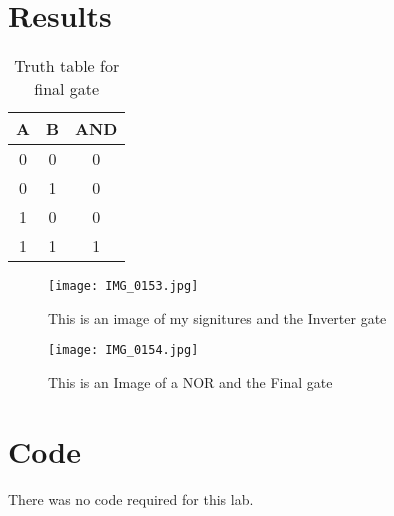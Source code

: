 \documentclass[11pt]{article}
\begin{document}
\section*{Results}

\begin{table}[ht]\centering
	\caption{Truth table for final gate}
	\label{tbl:example_table}
	\begin{tabular}{cc|c}
		\toprule
		A & B & AND \\
		\midrule
		0 & 0 & 0 \\
		0 & 1 & 0 \\
		1 & 0 & 0 \\
		1 & 1 & 1 \\
		\bottomrule
	\end{tabular} 
\end{table}

\begin{figure}[ht]\centering
	\texttt{[image: IMG\_0153.jpg]}
	\caption{This is an image of my signitures and the Inverter gate}
	\label{fig:image}		%
\end{figure}

\begin{figure}[ht]\centering
	\texttt{[image: IMG\_0154.jpg]}
	\caption{This is an Image of a NOR and the Final gate}
	\label{fig:image}		%
\end{figure}

\clearpage
\section*{Code}

There was no code required for this lab.
\end{document}
